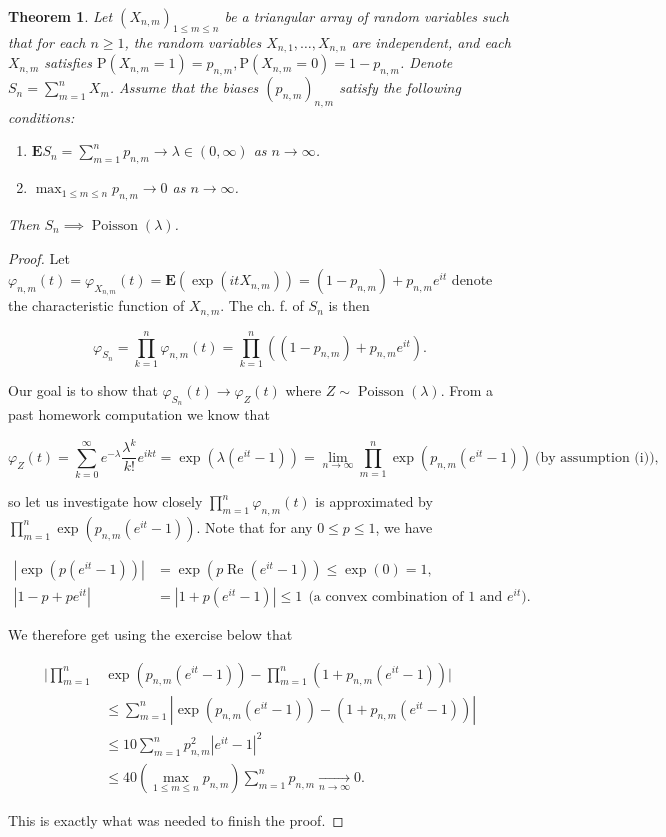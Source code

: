 \documentclass[11pt]{report}
\theoremstyle{plain}
\newtheorem{thm}{Theorem}[chapter]
\theoremstyle{definition}
\begin{document}
\begin{thm}
Let $(X_{n,m})_{1\le m\le n}$ be a triangular array
of random variables such that for each $n\ge1$, the
random variables $X_{n,1},\ldots,X_{n,n}$ are
independent, and each $X_{n,m}$ satisfies
$\mathrm{P}(X_{n,m}=1)=p_{n,m},
\mathrm{P}(X_{n,m}=0)=1-p_{n,m}$.
Denote $S_n=\sum_{m=1}^n X_m$. Assume that the biases
$(p_{n,m})_{n,m}$ satisfy the following conditions:

\begin{enumerate}[label=(\roman*)]
\item $\mathbf{E} S_n = \sum_{m=1}^n p_{n,m} \to
\lambda\in(0,\infty)$
as $n\to\infty$.

\item $\max_{1\le m\le n} p_{n,m} \to 0$ as $n\to\infty$.
\end{enumerate}

\noindent Then $S_n \implies \operatorname{Poisson}(\lambda)$.
\end{thm}

\begin{proof}
Let
$\varphi_{n,m}(t)=\varphi_{X_{n,m}}(t)=\mathbf{E}(\exp(it
X_{n,m})) = (1-p_{n,m})+p_{n,m}e^{it}$
denote the characteristic function of $X_{n,m}$. The
ch. f. of $S_n$ is then

\[
\varphi_{S_n} = \prod_{k=1}^n \varphi_{n,m}(t) = \prod_{k=1}^n \left((1-p_{n,m})+p_{n,m}e^{it}\right).
\]

\noindent Our goal is to show that
$\varphi_{S_n}(t)\to \varphi_Z(t)$ where
$Z\sim \operatorname{Poisson}(\lambda)$. From a past
homework computation we know that

\[
\varphi_Z(t) = \sum_{k=0}^\infty e^{-\lambda} \frac{\lambda^k}{k!} e^{ikt} =\exp(\lambda(e^{it}-1)) = \lim_{n\to\infty} \prod_{m=1}^n \exp(p_{n,m}(e^{it}-1))
 \ \textrm{(by assumption (i)),}
\]

\noindent so let us investigate how closely
$\prod_{m=1}^n\varphi_{n,m}(t)$ is approximated by
$\prod_{m=1}^n\exp(p_{n,m}(e^{it}-1))$. Note that for
any $0\le p\le 1$, we have

\begin{align*}
|\exp(p(e^{it}-1))| &= \exp(p \operatorname{Re}(e^{it}-1)) \le \exp(0)=1, \\
|1-p+pe^{it}| &= |1+p(e^{it}-1)| \le 1 \ \ \textrm{(a convex combination of $1$ and $e^{it}$)}.
\end{align*}

\noindent We therefore get using the exercise below that

\begin{align*}
\Bigg| \prod_{m=1}^n &\exp\left(p_{n,m}(e^{it}-1)\right)-\prod_{m=1}^n (1+p_{n,m}(e^{it}-1))\Bigg| \\ &
\le \sum_{m=1}^n |\exp\left(p_{n,m}(e^{it}-1)\right)-(1+p_{n,m}(e^{it}-1))| \\
&\le 10\sum_{m=1}^n p_{n,m}^2 |e^{it}-1|^2 \\
&\le 40\left(\max_{1\le m\le n} p_{n,m}\right) \sum_{m=1}^n p_{n,m} \xrightarrow[n\to\infty]{} 0.
\end{align*}

\noindent This is exactly what was needed to finish the proof.
\end{proof}
\end{document}
